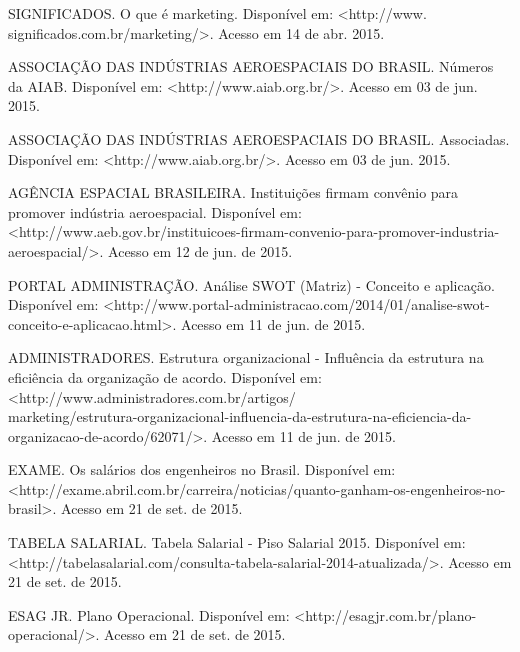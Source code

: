 \documentclass[
	12pt,				%
	openright,			%
	oneside,			%
	a4paper,			%
	english,			%
	french,				%
	spanish,			%
	brazil				%
	]{abntex2}
\begin{document}
	SIGNIFICADOS. O que é marketing. Disponível em: <http://www. significados.com.br/marketing/>. Acesso em 14 de abr. 2015.

	ASSOCIAÇÃO DAS INDÚSTRIAS AEROESPACIAIS DO BRASIL. Números da AIAB. Disponível em: <http://www.aiab.org.br/>. Acesso em 03 de jun. 2015.
	
	ASSOCIAÇÃO DAS INDÚSTRIAS AEROESPACIAIS DO BRASIL. Associadas. Disponível em: <http://www.aiab.org.br/>. Acesso em 03 de jun. 2015.
	
	AGÊNCIA ESPACIAL BRASILEIRA. Instituições firmam convênio para promover indústria aeroespacial. Disponível em: <http://www.aeb.gov.br/instituicoes-firmam-convenio-para-promover-industria-aeroespacial/>. Acesso em 12 de jun. de 2015.
	
	PORTAL ADMINISTRAÇÃO. Análise SWOT (Matriz) - Conceito e aplicação. Disponível em: <http://www.portal-administracao.com/2014/01/analise-swot-conceito-e-aplicacao.html>. Acesso em 11 de jun. de 2015.

	ADMINISTRADORES. Estrutura organizacional - Influência da estrutura na eficiência da organização de acordo. Disponível em: <http://www.administradores.com.br/artigos/\\marketing/estrutura-organizacional-influencia-da-estrutura-na-eficiencia-da-organizacao-de-acordo/62071/>. Acesso em 11 de jun. de 2015.
	
	EXAME. Os salários dos engenheiros no Brasil. Disponível em:\\ <http://exame.abril.com.br/carreira/noticias/quanto-ganham-os-engenheiros-no-brasil>. Acesso em 21 de set. de 2015.
	
	TABELA SALARIAL. Tabela Salarial - Piso Salarial 2015. Disponível em:\\ <http://tabelasalarial.com/consulta-tabela-salarial-2014-atualizada/>. Acesso em 21 de set. de 2015.
	
	ESAG JR. Plano Operacional. Disponível em: <http://esagjr.com.br/plano-operacional/>. Acesso em 21 de set. de 2015.

\end{document}

